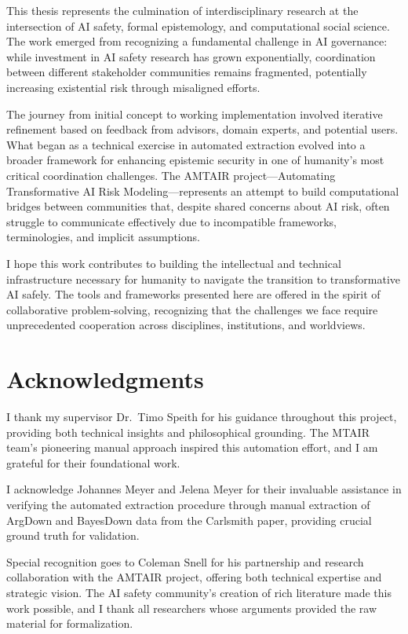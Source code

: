 \documentclass[
  11pt,
  letterpaper,
  openany]{book}
\begin{document}
This thesis represents the culmination of interdisciplinary research at
the intersection of AI safety, formal epistemology, and computational
social science. The work emerged from recognizing a fundamental
challenge in AI governance: while investment in AI safety research has
grown exponentially, coordination between different stakeholder
communities remains fragmented, potentially increasing existential risk
through misaligned efforts.

The journey from initial concept to working implementation involved
iterative refinement based on feedback from advisors, domain experts,
and potential users. What began as a technical exercise in automated
extraction evolved into a broader framework for enhancing epistemic
security in one of humanity's most critical coordination challenges. The
AMTAIR project---Automating Transformative AI Risk Modeling---represents
an attempt to build computational bridges between communities that,
despite shared concerns about AI risk, often struggle to communicate
effectively due to incompatible frameworks, terminologies, and implicit
assumptions.

I hope this work contributes to building the intellectual and technical
infrastructure necessary for humanity to navigate the transition to
transformative AI safely. The tools and frameworks presented here are
offered in the spirit of collaborative problem-solving, recognizing that
the challenges we face require unprecedented cooperation across
disciplines, institutions, and worldviews.

\section{Acknowledgments}\label{acknowledgments}

I thank my supervisor Dr.~Timo Speith for his guidance throughout this
project, providing both technical insights and philosophical grounding.
The MTAIR team's pioneering manual approach inspired this automation
effort, and I am grateful for their foundational work.

I acknowledge Johannes Meyer and Jelena Meyer for their invaluable
assistance in verifying the automated extraction procedure through
manual extraction of ArgDown and BayesDown data from the Carlsmith
paper, providing crucial ground truth for validation.

Special recognition goes to Coleman Snell for his partnership and
research collaboration with the AMTAIR project, offering both technical
expertise and strategic vision. The AI safety community's creation of
rich literature made this work possible, and I thank all researchers
whose arguments provided the raw material for formalization.
\end{document}
